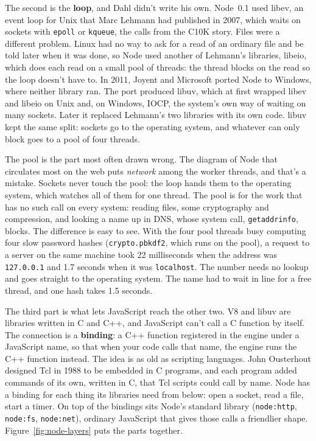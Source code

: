 The second is the \textbf{loop}, and Dahl didn't write his own. Node~0.1 used
libev, an event loop for Unix that Marc Lehmann had published in 2007, which
waits on sockets with \texttt{epoll} or \texttt{kqueue}, the calls from the
C10K story. Files were a different problem. Linux had no way to ask for a read
of an ordinary file and be told later when it was done, so Node used another of
Lehmann's libraries, libeio, which does each read on a small pool of threads:
the thread blocks on the read so the loop doesn't have to. In 2011, Joyent and
Microsoft ported Node to Windows, where neither library ran. The port produced
libuv, which at first wrapped libev and libeio on Unix and, on Windows, IOCP,
the system's own way of waiting on many sockets. Later it replaced Lehmann's two
libraries with its own code. libuv kept the same
split: sockets go to the operating system, and whatever can only block goes to
a pool of four threads.

The pool is the part most often drawn wrong. The diagram of Node that circulates
most on the web puts \emph{network} among the worker threads, and that's a
mistake. Sockets never touch the pool: the loop hands them to the operating
system, which watches all of them for one thread. The pool is for the work that
has no such call on every system: reading files, some cryptography and
compression, and looking a name up in DNS, whose system call, \texttt{getaddrinfo},
blocks. The difference is easy to see. With the four pool threads busy
computing four slow password hashes (\texttt{crypto.pbkdf2}, which runs on the
pool), a request to a server on the same machine took 22 milliseconds when the
address was \texttt{127.0.0.1} and 1.7 seconds when it was \texttt{localhost}.
The number needs no lookup and goes straight to the operating system. The name
had to wait in line for a free thread, and one hash takes 1.5 seconds.

The third part is what lets JavaScript reach the other two. V8 and libuv are
libraries written in C and C++, and JavaScript can't call a C function by
itself. The connection is a \textbf{binding}: a C++ function registered in the
engine under a JavaScript name, so that when your code calls that name, the
engine runs the C++ function instead. The idea is as old as scripting
languages. John Ousterhout designed Tcl in 1988 to be embedded in C programs,
and each program added commands of its own, written in C, that Tcl scripts
could call by name. Node has a binding for each thing its libraries need from
below: open a socket, read a file, start a timer. On top of the bindings sits
Node's standard library (\texttt{node:http}, \texttt{node:fs},
\texttt{node:net}), ordinary JavaScript that gives those calls a friendlier
shape. Figure~\ref{fig:node-layers} puts the parts together.

